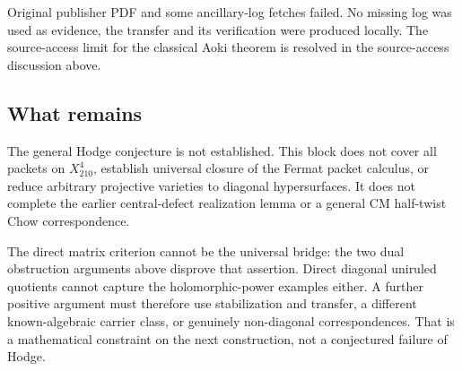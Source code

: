 Original publisher PDF and some ancillary-log fetches failed. No missing
log was used as evidence, the transfer and its verification were
produced locally. The source-access limit for the classical Aoki theorem
is resolved in the source-access discussion above.

\hypertarget{transfer210-what-remains}{%
\subsection{What remains}\label{transfer210-what-remains}}

The general Hodge conjecture is not established. This block does not
cover all packets on \(X_{210}^4\), establish universal closure of the
Fermat packet calculus, or reduce arbitrary projective varieties to
diagonal hypersurfaces. It does not complete the earlier central-defect
realization lemma or a general CM half-twist Chow correspondence.

The direct matrix criterion cannot be the universal bridge: the two dual
obstruction arguments above disprove that assertion. Direct diagonal
uniruled quotients cannot capture the holomorphic-power examples either.
A further positive argument must therefore use stabilization and
transfer, a different known-algebraic carrier class, or genuinely
non-diagonal correspondences. That is a mathematical constraint on the
next construction, not a conjectured failure of Hodge.
